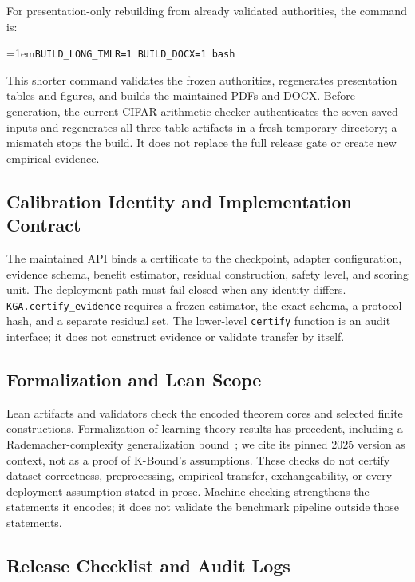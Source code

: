 For presentation-only rebuilding from already validated authorities, the command is:
\par\vspace{1pt}\noindent\hangindent=1em{\small\texttt{BUILD\_LONG\_TMLR=1 BUILD\_DOCX=1 bash }%
}\par\vspace{1pt}
This shorter command validates the frozen authorities, regenerates presentation tables and figures,
and builds the maintained PDFs and DOCX. Before generation, the current CIFAR
arithmetic checker authenticates the seven saved inputs and regenerates all three
table artifacts in a fresh temporary directory; a mismatch stops the build.
It does not replace the full release gate or create new empirical evidence.

\subsection{Calibration Identity and Implementation Contract}

The maintained API binds a certificate to the checkpoint, adapter configuration, evidence schema,
benefit estimator, residual construction, safety level, and scoring unit. The deployment path must
fail closed when any identity differs. \texttt{KGA.certify\_evidence} requires a frozen estimator,
the exact schema, a protocol hash, and a separate residual set. The lower-level
\texttt{certify} function is an audit interface; it does not construct evidence or validate
transfer by itself.

\subsection{Formalization and Lean Scope}

Lean artifacts and validators check the encoded theorem cores and selected finite constructions.
Formalization of learning-theory results has precedent, including a Rademacher-complexity
generalization bound~\cite{sonoda2025lean}; we cite its pinned 2025 version as context, not as a
proof of K-Bound's assumptions.
These checks do not certify dataset correctness, preprocessing, empirical transfer, exchangeability, or
every deployment assumption stated in prose. Machine checking strengthens the statements it
encodes; it does not validate the benchmark pipeline outside those statements.

\subsection{Release Checklist and Audit Logs}

